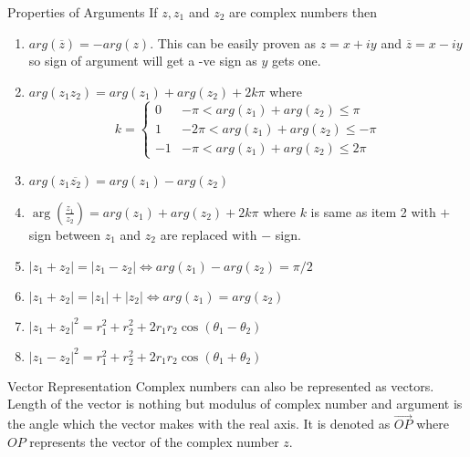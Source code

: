 \documentclass[aspectratio=169,8pt]{beamer}
\begin{document}
\begin{frame}{Properties of Arguments}
  If $z, z_1$ and $z_2$ are complex numbers then
  \begin{enumerate}
    \item $arg(\overline{z}) = -arg(z)$. This can be easily proven as $z = x +
      iy$ and $\overline{z} = x - iy$ so sign of argument will get a -ve sign
      as $y$ gets one.
    \item $arg(z_1z_2) = arg(z_1) + arg(z_2) + 2k\pi$ where
      $$k = \begin{cases}0 & -\pi <arg(z_1) + arg(z_2) \leq \pi\\
      1 & -2\pi < arg(z_1) + arg(z_2)\leq -\pi\\
      -1 & -\pi < arg(z_1) + arg(z_2)\leq 2\pi\end{cases}$$
    \item $arg(z_1\overline{z_2}) = arg(z_1) - arg(z_2)$
    \item $\arg\left(\frac{z_1}{z_2}\right) = arg(z_1) + arg(z_2) + 2k\pi$
      where $k$ is same as item 2 with $+$ sign between $z_1$ and $z_2$ are
      replaced with $-$ sign.
    \item $|z_1 + z_2| = |z_1 - z_2|\Leftrightarrow arg(z_1) - arg(z_2) =
      \pi/2$
    \item $|z_1 + z_2| = |z_1| + |z_2|\Leftrightarrow arg(z_1) = arg(z_2)$
    \item $|z_1 + z_2|^2 = r_1^2 + r_2^2 + 2r_1r_2\cos(\theta_1 - \theta_2)$
    \item $|z_1 - z_2|^2 = r_1^2 + r_2^2 + 2r_1r_2\cos(\theta_1 + \theta_2)$
  \end{enumerate}
\end{frame}
\begin{frame}{Vector Representation}
  Complex numbers can also be represented as vectors. Length of the vector is
  nothing but modulus of complex number and argument is the angle which the
  vector makes with the real axis. It is denoted as $\overrightarrow{OP}$ where
  $OP$ represents the vector of the complex number $z.$
\end{frame}
\end{document}

